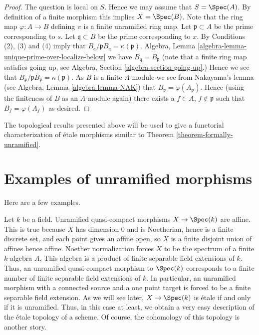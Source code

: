 \begin{proof}
The question is local on $S$. Hence we may assume that $S = \Spec(A)$.
By definition of a finite morphism this implies $X = \Spec(B)$.
Note that the ring map $\varphi : A \to B$ defining $\pi$
is a finite unramified ring map.
Let $\mathfrak p \subset A$ be the prime corresponding to $s$.
Let $\mathfrak q \subset B$ be the prime corresponding to $x$. By
Conditions (2), (3) and (4) imply that
$B_{\mathfrak q}/\mathfrak pB_{\mathfrak q} = \kappa(\mathfrak p)$.
Algebra, Lemma \ref{algebra-lemma-unique-prime-over-localize-below}
we have $B_{\mathfrak q} = B_{\mathfrak p}$
(note that a finite ring map satisfies going up, see
Algebra, Section \ref{algebra-section-going-up}.)
Hence we see that
$B_{\mathfrak p}/\mathfrak pB_{\mathfrak p} = \kappa(\mathfrak p)$.
As $B$ is a finite $A$-module we see from Nakayama's lemma (see
Algebra, Lemma \ref{algebra-lemma-NAK})
that $B_{\mathfrak p} = \varphi(A_{\mathfrak p})$. Hence (using the finiteness
of $B$ as an $A$-module again) there exists a
$f \in A$, $f \not \in \mathfrak p$ such that $B_f = \varphi(A_f)$
as desired.
\end{proof}

\noindent
The topological results presented above will be used to give a functorial
characterization of \'etale morphisms similar to Theorem
\ref{theorem-formally-unramified}.




\section{Examples of unramified morphisms}
\label{section-examples}

\noindent
Here are a few examples.

\begin{example}
\label{example-etale-field-extensions}
Let $k$ be a field.
Unramified quasi-compact morphisms $X \to \Spec(k)$ are affine.
This is true because $X$ has dimension $0$ and is Noetherian,
hence is a finite discrete set, and each point gives an affine open,
so $X$ is a finite disjoint union of affines hence affine.
Noether normalization forces $X$ to be the spectrum of a finite
$k$-algebra $A$.
This algebra is a product of finite separable field extensions of $k$.
Thus, an unramified quasi-compact morphism to $\Spec(k)$
corresponds to a finite number of finite separable field extensions of $k$.
In particular, an unramified morphism with a connected source and a one point
target is forced to be a finite separable field extension.
As we will see later, $X \to \Spec(k)$ is \'etale if and
only if it is unramified. Thus, in this case at least, we obtain a very easy
description of the \'etale topology of a scheme. Of course, the cohomology of
this topology is another story.
\end{example}

